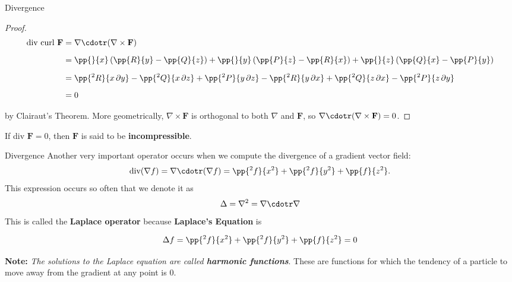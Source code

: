 \documentclass[11pt,english,
handout
]{beamer}
\begin{document}
\begin{frame}[t]{Divergence}
\small
\begin{proof}
\vspace{-5mm}
\begin{align*}
\text{div curl }\mathbf{F}&=\nabla \cdotr(\nabla\times\mathbf{F})\\[2mm]
&=\pp{}{x}\left(\pp{R}{y}-\pp{Q}{z}\right)+\pp{}{y}\left(\pp{P}{z}-\pp{R}{x}\right)+\pp{}{z}\left(\pp{Q}{x}-\pp{P}{y}\right)\\[2mm]
&=\pp{^2R}{x\,\partial y}-\pp{^2Q}{x\,\partial z}+\pp{^2P}{y\,\partial z}-\pp{^2R}{y\,\partial x}+\pp{^2Q}{z\,\partial x}-\pp{^2P}{z\,\partial y}\\[2mm]
&=0
\end{align*}

by Clairaut's Theorem. \pause More geometrically, $\nabla\times\mathbf{F}$ is orthogonal to both $\nabla$ and $\mathbf{F}$, so $\nabla\cdotr(\nabla\times\mathbf{F})=0$.
\end{proof}\pause

\lspace
\begin{definition}
If div $\mathbf{F}=0$, then $\mathbf{F}$ is said to be \textbf{incompressible}.
\end{definition}
\end{frame}











\begin{frame}[t]{Divergence}
\footnotesize
Another very important operator occurs when we compute the divergence of a gradient vector field:
\[
\text{div}(\nabla f)=\nabla \cdotr(\nabla f)=\pp{^2f}{x^2}+\pp{^2f}{y^2}+\pp{f}{z^2}.
\]\pause 
This expression occurs so often that we denote it as
\[
\Delta=\nabla^2=\nabla \cdotr \nabla
\]\pause
This is called the \textbf{Laplace operator} because \textbf{Laplace's Equation} is

\[
\Delta f=\pp{^2f}{x^2}+\pp{^2f}{y^2}+\pp{f}{z^2}=0
\]\pause

\textbf{Note:} \textit{The solutions to the Laplace equation are called \textbf{harmonic functions}}. These are functions for which the tendency of a particle to move away from the gradient at any point is 0.
\end{frame}
\end{document}
